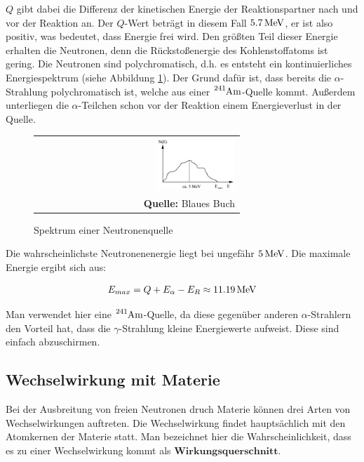 \documentclass[a4paper,titlepage]{scrartcl}
\numberwithin{equation}{section}
\begin{document}
$Q$ gibt dabei die Differenz der kinetischen Energie der Reaktionspartner nach und vor der Reaktion an. Der $Q$-Wert beträgt in diesem Fall $\unit[5.7]{MeV}$, er ist also positiv, was bedeutet, dass Energie frei wird. Den größten Teil dieser Energie erhalten die Neutronen, denn die Rückstoßenergie des Kohlenstoffatoms ist gering.  Die Neutronen sind polychromatisch, d.h. es entsteht ein kontinuierliches Energiespektrum (siehe Abbildung \ref{fig:spektrum}). Der Grund dafür ist, dass bereits die $\alpha$-Strahlung polychromatisch ist, welche aus einer $\ce{^{241}Am}$-Quelle kommt. Außerdem unterliegen die $\alpha$-Teilchen schon vor der Reaktion einem Energieverlust in der Quelle.\\
\begin{figure}[H]
	\centering
	\begin{tabular}{@{}r@{}}
		\includegraphics[width=0.4\textwidth]{spektrum.PNG}\\
		\footnotesize\sffamily\textbf{Quelle:} Blaues Buch \cite{blauesBuch}
	\end{tabular}
	\caption{Spektrum einer Neutronenquelle}
    \label{fig:spektrum}
\end{figure}
Die wahrscheinlichste Neutronenenergie liegt bei ungefähr $\unit[5]{MeV}$. Die maximale Energie ergibt sich aus:

\begin{equation}
E_{max}= Q + E_{\alpha}-E_{R} \approx \unit[11.19]{MeV}
\end{equation}

Man verwendet hier eine $\ce{^{241}Am}$-Quelle, da diese gegenüber anderen $\alpha$-Strahlern den Vorteil hat, dass die $\gamma$-Strahlung kleine Energiewerte aufweist. Diese sind einfach abzuschirmen.

\subsection{Wechselwirkung mit Materie}
Bei der Ausbreitung von freien Neutronen druch Materie können drei Arten von Wechselwirkungen auftreten. Die Wechselwirkung findet hauptsächlich mit den Atomkernen der Materie statt. Man bezeichnet hier die Wahrscheinlichkeit, dass es zu einer Wechselwirkung kommt als $\textbf{Wirkungsquerschnitt}$.
\end{document}
